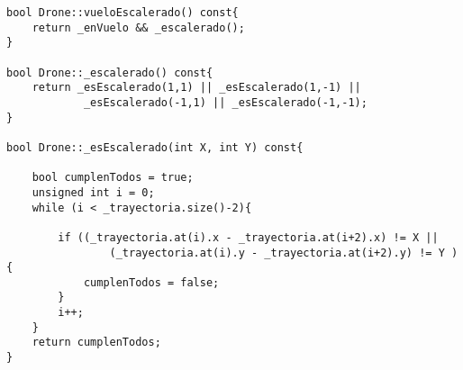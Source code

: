 \begin{lstlisting}
bool Drone::vueloEscalerado() const{
    return _enVuelo && _escalerado();
}

bool Drone::_escalerado() const{
    return _esEscalerado(1,1) || _esEscalerado(1,-1) ||
            _esEscalerado(-1,1) || _esEscalerado(-1,-1);
}

bool Drone::_esEscalerado(int X, int Y) const{

    bool cumplenTodos = true;
    unsigned int i = 0;
    while (i < _trayectoria.size()-2){

        if ((_trayectoria.at(i).x - _trayectoria.at(i+2).x) != X ||
                (_trayectoria.at(i).y - _trayectoria.at(i+2).y) != Y ){
            cumplenTodos = false;
        }
        i++;
    }
    return cumplenTodos;
}
\end{lstlisting}
